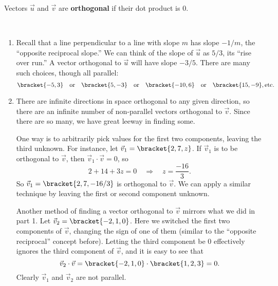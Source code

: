 \begin{definition}[Orthogonal]\label{def:orthogonal}
Vectors $\vec u$ and $\vec v$ are \textbf{orthogonal} if their dot product is 0.
\end{definition}


{\mbox{}\\[-\baselineskip]\begin{enumerate}
	\item Recall that a line perpendicular to a line with slope $m$ has slope $-1/m$, the ``opposite reciprocal slope.'' We can think of the slope of $\vec u$ as $5/3$, its ``rise over run.'' A vector orthogonal to $\vec u$ will have slope $-3/5$. There are many such choices, though all parallel:
	\[\bracket{-5,3}\quad \text{or} \quad\bracket{5,-3}\quad \text{or} \quad \bracket{-10,6}\quad \text{or} \quad \bracket{15,-9},\text{etc.}\]
	\item		There are infinite directions in space orthogonal to any given direction, so there are an infinite number of non-parallel vectors orthogonal to $\vec v$. Since there are so many, we have great leeway in finding some.
	
	One way is to arbitrarily pick values for the first two components, leaving the third unknown. For instance, let $\vec v_1 = \bracket{2,7,z}$. If $\vec v_1$ is to be orthogonal to $\vec v$, then $\vec v_1\cdot\vec v = 0$, so 
	\[2+14+3z=0 \quad \Rightarrow \quad z = \frac{-16}{3}.\]
	So $\vec v_1 = \bracket{2, 7, -16/3}$ is orthogonal to $\vec v$. We can apply a similar technique by leaving the first or second component unknown.
	
	Another method of finding a vector orthogonal to $\vec v$ mirrors what we did in part 1. Let $\vec v_2 = \bracket{-2,1,0}$. Here we switched the first two components of $\vec v$, changing the sign of one of them (similar to the ``opposite reciprocal'' concept before). Letting the third component be 0 effectively ignores the third component of $\vec v$, and it is easy to see that 
	\[\vec v_2\cdot\vec v = \bracket{-2,1,0}\cdot\bracket{1,2,3}= 0.\]
	Clearly $\vec v_1$ and $\vec v_2$ are not parallel.\eoehere
\end{enumerate}}

